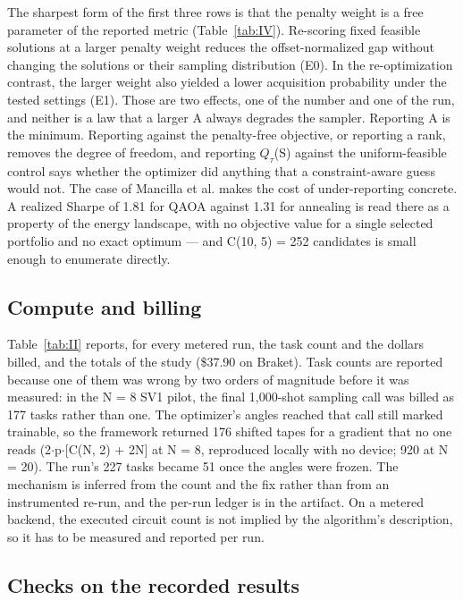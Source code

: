 \documentclass[journal]{IEEEtran}
\begin{document}
The sharpest form of the first three rows is that the penalty weight is a free parameter of the reported metric (Table~\ref{tab:IV}). Re-scoring fixed feasible solutions at a larger penalty weight reduces the offset-normalized gap without changing the solutions or their sampling distribution (E0). In the re-optimization contrast, the larger weight also yielded a lower acquisition probability under the tested settings (E1). Those are two effects, one of the number and one of the run, and neither is a law that a larger A always degrades the sampler. Reporting A is the minimum. Reporting against the penalty-free objective, or reporting a rank, removes the degree of freedom, and reporting $Q_{\tau}$(S) against the uniform-feasible control says whether the optimizer did anything that a constraint-aware guess would not. The case of Mancilla et al. \cite{ref27} makes the cost of under-reporting concrete. A realized Sharpe of 1.81 for QAOA against 1.31 for annealing is read there as a property of the energy landscape, with no objective value for a single selected portfolio and no exact optimum --- and C(10, 5) = 252 candidates is small enough to enumerate directly.


\subsection{Compute and billing}


Table~\ref{tab:II} reports, for every metered run, the task count and the dollars billed, and the totals of the study (\$37.90 on Braket). Task counts are reported because one of them was wrong by two orders of magnitude before it was measured: in the N = 8 SV1 pilot, the final 1,000-shot sampling call was billed as 177 tasks rather than one. The optimizer's angles reached that call still marked trainable, so the framework returned 176 shifted tapes for a gradient that no one reads (2$\cdot$p$\cdot$[C(N, 2) + 2N] at N = 8, reproduced locally with no device; 920 at N = 20). The run's 227 tasks became 51 once the angles were frozen. The mechanism is inferred from the count and the fix rather than from an instrumented re-run, and the per-run ledger is in the artifact. On a metered backend, the executed circuit count is not implied by the algorithm's description, so it has to be measured and reported per run.


\subsection{Checks on the recorded results}
\end{document}
